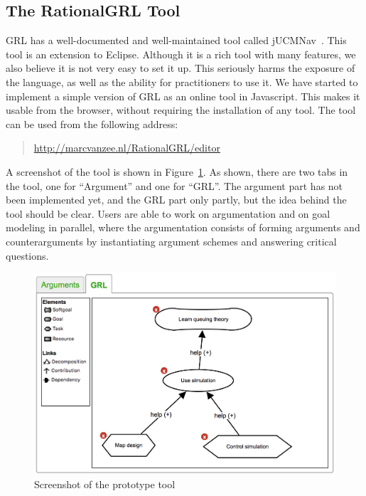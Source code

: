 \subsection{The RationalGRL Tool}

GRL has a well-documented and well-maintained tool called jUCMNav~\cite{jUCMNav}. This tool is an extension to Eclipse. Although it is a rich tool with many features, we also believe it is not very easy to set it up. This seriously harms the exposure of the language, as well as the ability for practitioners to use it. We have started to implement a simple version of GRL as an online tool in Javascript. This makes it usable from the browser, without requiring the installation of any tool. The tool can be used from the following address:

\begin{quote}
\url{http://marcvanzee.nl/RationalGRL/editor}
\end{quote}

A screenshot of the tool is shown in Figure~\ref{fig:goalmodeling:tool}. As shown, there are two tabs in the tool, one for ``Argument'' and one for ``GRL''. The argument part has not been implemented yet, and the GRL part only partly, but the idea behind the tool should be clear. Users are able to work on argumentation and on goal modeling in parallel, where the argumentation consists of forming arguments and counterarguments by instantiating argument schemes and answering critical questions. 

\begin{figure}[h!]
\centering
\includegraphics[scale=0.5]{img/tool_screen}
\caption{Screenshot of the prototype tool}
\label{fig:goalmodeling:tool}
\end{figure}

